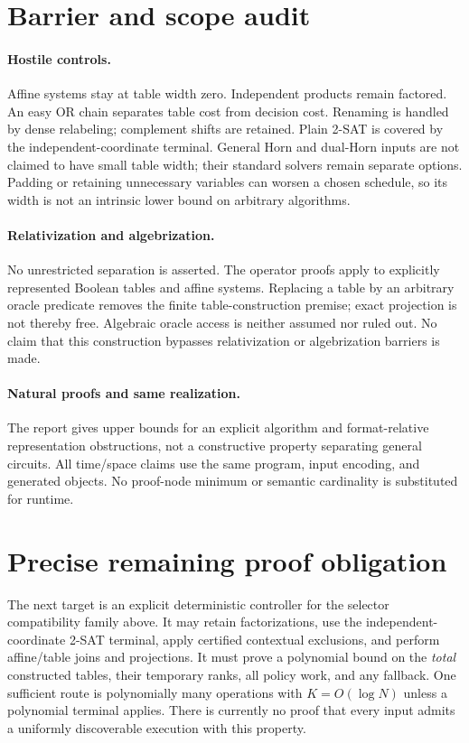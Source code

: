 \documentclass[11pt]{article}
\begin{document}
\section{Barrier and scope audit}
\paragraph{Hostile controls.}
Affine systems stay at table width zero. Independent products remain factored.
An easy OR chain separates table cost from decision cost. Renaming is handled
by dense relabeling; complement shifts are retained. Plain 2-SAT is covered by
the independent-coordinate terminal. General Horn and dual-Horn inputs are not
claimed to have small table width; their standard solvers remain separate options.
Padding or retaining unnecessary variables can worsen a chosen schedule, so its
width is not an intrinsic lower bound on arbitrary algorithms.

\paragraph{Relativization and algebrization.}
No unrestricted separation is asserted. The operator proofs apply to explicitly
represented Boolean tables and affine systems. Replacing a table by an arbitrary
oracle predicate removes the finite table-construction premise; exact projection
is not thereby free. Algebraic oracle access is neither assumed nor ruled out.
No claim that this construction bypasses relativization or algebrization barriers
is made.

\paragraph{Natural proofs and same realization.}
The report gives upper bounds for an explicit algorithm and format-relative
representation obstructions, not a constructive property separating general
circuits. All time/space claims use the same program, input encoding, and generated
objects. No proof-node minimum or semantic cardinality is substituted for runtime.

\section{Precise remaining proof obligation}
The next target is an explicit deterministic controller for the selector
compatibility family above. It may retain factorizations, use the independent-
coordinate 2-SAT terminal, apply certified contextual exclusions, and perform
affine/table joins and projections. It must prove a polynomial bound on the
\emph{total} constructed tables, their temporary ranks, all policy work, and any
fallback. One sufficient route is polynomially many operations with
$K=O(\log N)$ unless a polynomial terminal applies. There is currently no proof
that every input admits a uniformly discoverable execution with this property.



\end{document}
